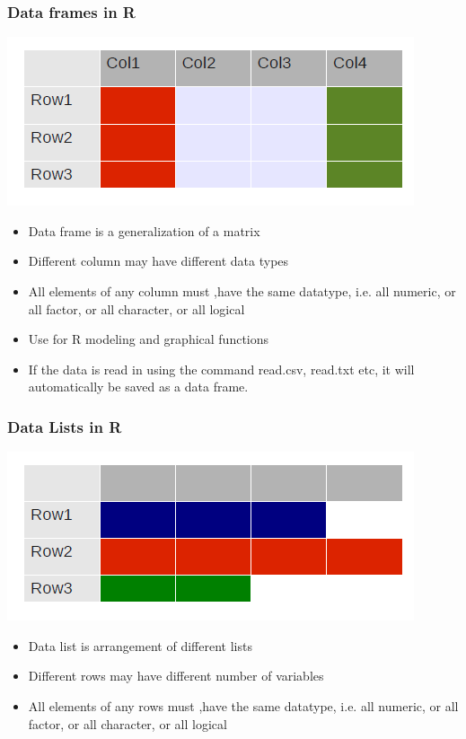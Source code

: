 \documentclass[12pt]{beamer}
\begin{document}
\begin{frame}[fragile]
\frametitle{Data frames in R}
\includegraphics[scale=0.5]{DataFRame}
\begin{itemize}\justifying
	\item Data frame is a generalization of a matrix
	\item Different column may have different data types
	\item All elements of any column must ,have the same datatype, i.e.
	all numeric, or all factor, or all character, or all logical
		\item Use for R modeling and graphical functions
		\item If the data is read in using the command read.csv, read.txt etc, it will
	automatically be saved as a data frame.
\end{itemize}
\end{frame}

\begin{frame}[fragile]
\frametitle{Data Lists in R}
\includegraphics[scale=0.5]{DataLists}
\begin{itemize}\justifying
	\item Data list is arrangement of different lists
		\item Different rows may have different number of variables
		\item  All elements of any rows must ,have the same datatype, i.e.
	all numeric, or all factor, or all character, or all logical
\end{itemize}
\end{frame}
\end{document}
